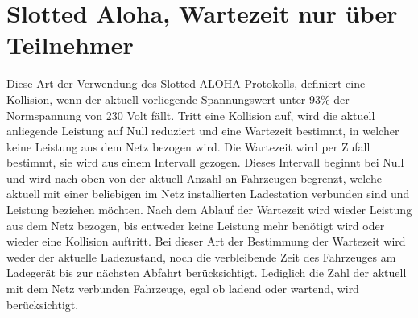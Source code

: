 \section{Slotted Aloha, Wartezeit nur über Teilnehmer}
\label{cap:background_sec:SA_participants}
Diese Art der Verwendung des Slotted ALOHA Protokolls, definiert eine Kollision, wenn der aktuell vorliegende Spannungswert unter 93\% der Normspannung von 230 Volt fällt. Tritt eine Kollision auf, wird die aktuell anliegende Leistung auf Null reduziert und eine Wartezeit bestimmt, in welcher keine Leistung aus dem Netz bezogen wird. Die Wartezeit wird per Zufall bestimmt, sie wird aus einem Intervall gezogen. Dieses Intervall beginnt  bei Null und wird nach oben von der aktuell Anzahl an Fahrzeugen begrenzt, welche aktuell mit einer beliebigen im Netz installierten Ladestation verbunden sind und Leistung beziehen möchten. Nach dem Ablauf der Wartezeit wird wieder Leistung aus dem Netz bezogen, bis entweder keine Leistung mehr benötigt wird oder wieder eine Kollision auftritt.
Bei dieser Art der Bestimmung der Wartezeit wird weder der aktuelle Ladezustand, noch die verbleibende Zeit des Fahrzeuges am Ladegerät bis zur nächsten Abfahrt berücksichtigt. Lediglich die Zahl der aktuell mit dem Netz verbunden Fahrzeuge, egal ob ladend oder wartend, wird berücksichtigt.

